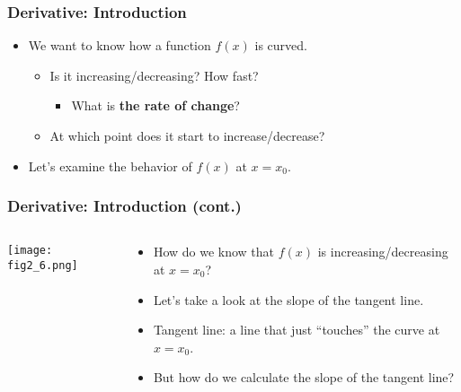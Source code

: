 \documentclass[pdflatex, 12pt]{beamer}
\begin{document}
\begin{frame}
\frametitle{Derivative: Introduction}
\begin{itemize}
\item We want to know how a function $f(x)$ is curved.
 \begin{itemize}
 \item Is it increasing/decreasing? How fast?
  \begin{itemize}
  \item What is \textbf{the rate of change}?
  \end{itemize}
 \item At which point does it start to increase/decrease?
 \end{itemize}
\vspace{0.4cm}
\item Let's examine the behavior of $f(x)$ at $x = x_0$.
\end{itemize}
\end{frame}

\begin{frame}
\frametitle{Derivative: Introduction (cont.)}
\begin{columns}
\begin{column}{0.5\textwidth}
\centering
\texttt{[image: fig2\_6.png]}
\end{column}
\begin{column}{0.5\textwidth}
\begin{itemize}
\item How do we know that $f(x)$ is increasing/decreasing at $x = x_0$?
\vspace{0.4cm}
\item Let's take a look at the slope of the tangent line.
\vspace{0.4cm}
\item Tangent line: a line that just ``touches'' the curve at $x = x_0$.
\vspace{0.4cm}
\item But how do we calculate the slope of the tangent line?
\end{itemize}
\end{column}
\end{columns}
\end{frame}
\end{document}
